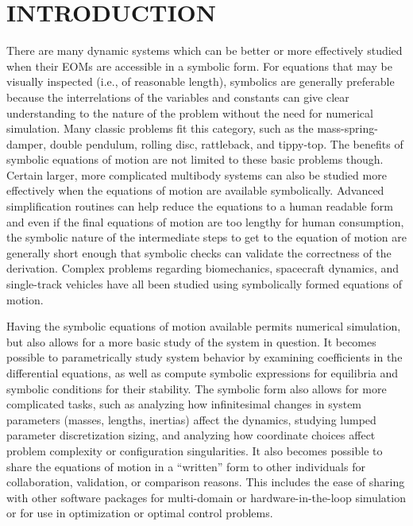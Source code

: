\documentclass[twocolumn,10pt]{asme2e}
\begin{document}
\section*{INTRODUCTION}
There are many dynamic systems which can be better or more effectively studied
when their EOMs are accessible in a symbolic form. For
equations that may be visually inspected (i.e., of reasonable length),
symbolics are generally preferable because the interrelations of the variables
and constants can give clear understanding to the nature of the problem without
the need for numerical simulation. Many classic problems fit this category,
such as the mass-spring-damper, double pendulum, rolling disc, rattleback, and
tippy-top. The benefits of symbolic equations of motion are not limited to
these basic problems though. Certain larger, more complicated multibody systems
can also be studied more effectively when the equations of motion are available
symbolically. Advanced simplification routines can help reduce the equations
to a human readable form and even if the final equations of motion are too
lengthy for human consumption, the symbolic nature of the intermediate steps to
get to the equation of motion are generally short enough that symbolic checks
can validate the correctness of the derivation. Complex problems regarding
biomechanics, spacecraft dynamics, and single-track vehicles have all been
studied using symbolically formed equations of motion.

Having the symbolic equations of motion available permits numerical simulation,
but also allows for a more basic study of the system in question. It becomes
possible to parametrically study system behavior by examining coefficients in
the differential equations, as well as compute symbolic expressions for
equilibria and symbolic conditions for their stability. The symbolic form also
allows for more complicated tasks, such as analyzing how infinitesimal changes
in system parameters (masses, lengths, inertias) affect the dynamics, studying
lumped parameter discretization sizing, and analyzing how coordinate choices
affect problem complexity or configuration singularities. It also becomes
possible to share the equations of motion in a ``written'' form to other
individuals for collaboration, validation, or comparison reasons. This includes
the ease of sharing with other software packages for multi-domain or
hardware-in-the-loop simulation or for use in optimization or optimal control
problems.
\end{document}
